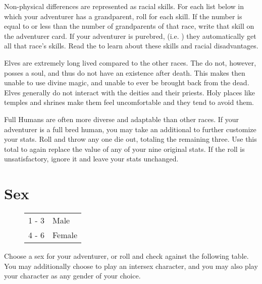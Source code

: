 \begin{multicols*}{2}
Non-physical differences are represented as racial skills. For each list below in which your adventurer has a grandparent, roll  for each skill. If the number is equal to or less than the number of grandparents of that race, write that skill on the adventurer card. If your adventurer is purebred, (i.e. ) they automatically get all that race's skills. Read the  to learn about these skills and racial disadvantages.

Elves are extremely long lived compared to the other races. The do not, however, posses a soul, and thus do not have an existence after death. This makes then unable to use divine magic, and unable to ever be brought back from the dead. Elves generally do not interact with the deities and their priests. Holy places like temples and shrines make them feel uncomfortable and they tend to avoid them.

Full Humans are often more diverse and adaptable than other races. If your adventurer is a full bred human, you may take an additional  to further customize your stats. Roll  and throw any one die out, totaling the remaining three. Use this total to again replace the value of any of your nine original stats. If the roll is unsatisfactory, ignore it and leave your stats unchanged.
\section{Sex}
\begin{wrapfigure}[5]{o}[0pt]{2.75cm}
\begin{normbox}
\begin{tabular}{l l}
1 - 3 & Male\\
4 - 6 & Female
\end{tabular}
\end{normbox}
\end{wrapfigure}
Choose a sex for your adventurer, or roll  and check against the following table. You may additionally choose to play an intersex character, and you may also play your character as any gender of your choice.

\end{multicols*}
